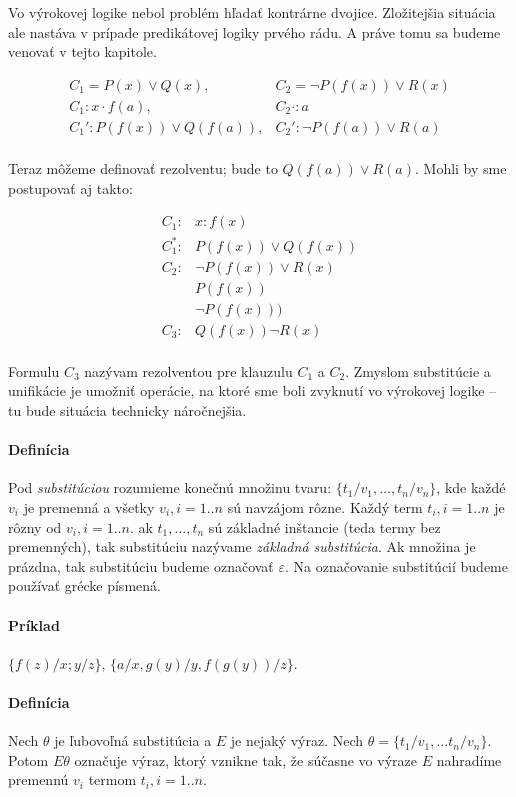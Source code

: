 Vo výrokovej logike nebol problém hľadať kontrárne dvojice.
Zložitejšia situácia ale nastáva v prípade predikátovej logiky
prvého rádu. A práve tomu sa budeme venovať v tejto kapitole.

$$
\begin{array}{ll}
C_1  = P(x) \lor Q(x),& C_2 = \neg P(f(x)) \lor R(x)\\
C_1:  x \cdot f(a),&  C_2 \cdot : a\\
C_1':  P(f(x)) \lor Q(f(a)),& C_2':\neg P(f(a)) \lor R(a)\\
\end{array}
$$

Teraz môžeme definovať rezolventu; bude to $Q(f(a)) \lor R(a)$. Mohli by sme
postupovať aj takto:

$$
\begin{array}{ll}
C_1: & x: f(x) \\
C_1^*: & P(f(x)) \lor Q(f(x)) \\
C_2: & \neg P(f(x)) \lor R(x)\\
 & P(f(x))\\
 & \neg P(f(x)))\\
C_3: & Q(f(x)) \neg R(x)\\
\end{array}
$$

Formulu $C_3$ nazývam rezolventou pre klauzulu $C_1$ a $C_2$. Zmyslom
substitúcie a unifikácie je umožniť operácie, na ktoré sme boli zvyknutí vo
výrokovej logike -- tu bude situácia technicky náročnejšia.

\paragraph{Definícia} Pod \emph{substitúciou} rozumieme konečnú množinu tvaru:
$\{t_1/v_1, \ldots, t_n/v_n\}$, kde každé $v_i$ je premenná a všetky $v_i,
i=1..n$ sú navzájom rôzne. Každý term $t_i, i=1..n$ je rôzny od $v_i, i=1..n$.
ak $t_1, \ldots, t_n$ sú základné inštancie (teda termy bez premenných), tak
substitúciu nazývame \emph{základná substitúcia}. Ak množina je prázdna, tak
substitúciu budeme označovať $\varepsilon$. Na označovanie substitúcií budeme
používať grécke písmená.

\paragraph{Príklad} $\{ f(z)/x; y/z\}$, $\{ a/x, g(y)/y, f(g(y))/z\}$.

\paragraph{Definícia} Nech $\theta$ je ľubovoľná substitúcia a $E$ je nejaký
výraz. Nech $\theta = \{ t_1/v_1, \ldots t_n/v_n\}$. Potom $E\theta$ označuje
výraz, ktorý vznikne tak, že súčasne vo výraze $E$ nahradíme premennú $v_i$
termom $t_i, i=1..n$.


